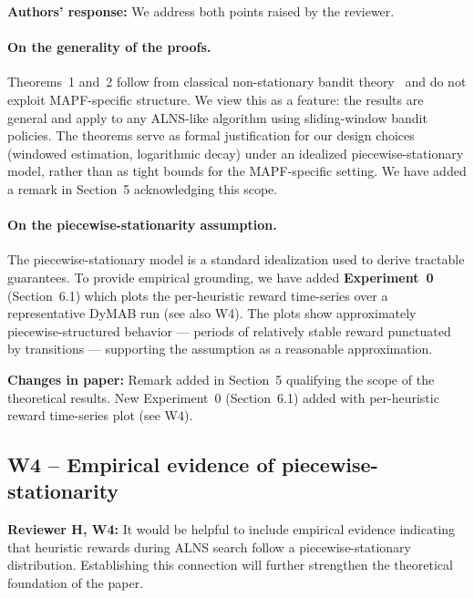 \documentclass[review]{jair}
\begin{document}
\begin{authorbox}
\textbf{Authors' response:} We address both points raised by the reviewer.

\paragraph{On the generality of the proofs.} Theorems~1 and~2 follow from classical non-stationary bandit theory~\citep{Non-Stationary} and do not exploit MAPF-specific structure. We view this as a feature: the results are general and apply to any ALNS-like algorithm using sliding-window bandit policies. The theorems serve as formal justification for our design choices (windowed estimation, logarithmic decay) under an idealized piecewise-stationary model, rather than as tight bounds for the MAPF-specific setting. We have added a remark in Section~5 acknowledging this scope.

\paragraph{On the piecewise-stationarity assumption.} The piecewise-stationary model is a standard idealization used to derive tractable guarantees. To provide empirical grounding, we have added \textbf{Experiment~0} (Section~6.1) which plots the per-heuristic reward time-series over a representative DyMAB run (see also W4). The plots show approximately piecewise-structured behavior --- periods of relatively stable reward punctuated by transitions --- supporting the assumption as a reasonable approximation.
\end{authorbox}

\begin{changebox}
\textbf{Changes in paper:} Remark added in Section~5 qualifying the scope of the theoretical results. New Experiment~0 (Section~6.1) added with per-heuristic reward time-series plot (see W4).
\end{changebox}

\subsection*{W4 -- Empirical evidence of piecewise-stationarity}

\begin{reviewerbox}
\textbf{Reviewer H, W4:} It would be helpful to include empirical evidence indicating that heuristic rewards during ALNS search follow a piecewise-stationary distribution. Establishing this connection will further strengthen the theoretical foundation of the paper.
\end{reviewerbox}
\end{document}
